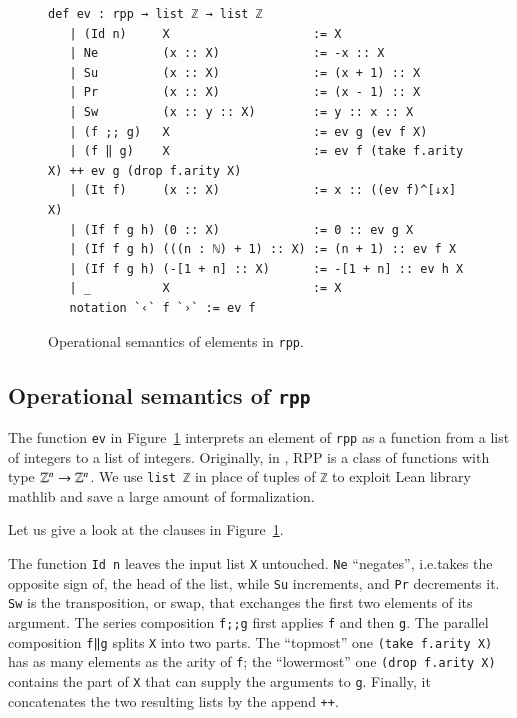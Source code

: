 \documentclass[preprint]{elsarticle}
\theoremstyle{remark}
\newcommand{\RPP}{\textsf{RPP}\xspace}
\newcommand{\MATHLIB}{\textsf{mathlib}\xspace}
\newcommand{\LEAN}{\textsf{Lean}\xspace}
\begin{document}
\begin{figure}
\begin{lstlisting}[basicstyle=\small]
   def ev : rpp → list ℤ → list ℤ
   | (Id n)     X                    := X
   | Ne         (x :: X)             := -x :: X
   | Su         (x :: X)             := (x + 1) :: X
   | Pr         (x :: X)             := (x - 1) :: X
   | Sw         (x :: y :: X)        := y :: x :: X
   | (f ;; g)   X                    := ev g (ev f X)
   | (f ‖ g)    X                    := ev f (take f.arity X) ++ ev g (drop f.arity X)
   | (It f)     (x :: X)             := x :: ((ev f)^[↓x] X)
   | (If f g h) (0 :: X)             := 0 :: ev g X
   | (If f g h) (((n : ℕ) + 1) :: X) := (n + 1) :: ev f X
   | (If f g h) (-[1 + n] :: X)      := -[1 + n] :: ev h X
   | _          X                    := X
   notation `‹` f `›` := ev f
\end{lstlisting}
\caption{Operational semantics of elements in \lstinline|rpp|.}
\label{fig:RPP-ev}
\end{figure}

\subsection{Operational semantics of {\normalfont \lstinline|rpp|}}
The function \lstinline|ev| in Figure~\ref{fig:RPP-ev} interprets an element of \lstinline|rpp| as a function from a list of integers to a list of integers. Originally, in \cite{DBLP:journals/tcs/PaoliniPR20}, \RPP is a class of functions with type $ \mathbb{Z}^n \rightarrow \mathbb{Z}^n $. We use \lstinline|list ℤ| in place of tuples of \lstinline|ℤ| to exploit  \LEAN library \MATHLIB and save a large amount of formalization.

Let us give a look at the clauses in Figure~\ref{fig:RPP-ev}.

The function \lstinline|Id n| leaves the input list \lstinline|X| untouched.
\lstinline|Ne| ``negates'', i.e.\@ takes the opposite sign of, the head of the list, while \lstinline|Su| increments, and \lstinline|Pr| decrements it.
\lstinline|Sw| is the transposition, or swap, that exchanges the first two elements of its argument.
The series composition \lstinline|f;;g| first applies \lstinline|f| and then
\lstinline|g|.
The parallel composition \lstinline|f‖g| splits \lstinline|X| into two parts. The ``topmost'' one \lstinline|(take f.arity X)| has as many elements as the arity of \lstinline|f|; the ``lowermost'' one \lstinline|(drop f.arity X)| contains the part of \lstinline|X| that can supply the arguments to \lstinline|g|. Finally, it concatenates the two resulting lists by the append \lstinline|++|.
\end{document}
